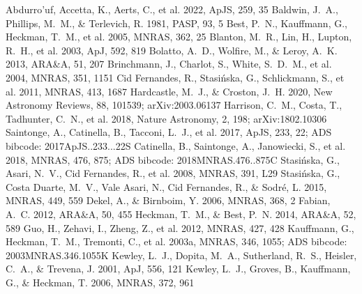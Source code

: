 \documentclass[twocolumn]{aastex631}
\begin{document}

\begin{thebibliography}{}
 Abdurro'uf, Accetta, K., Aerts, C., et al. 2022, ApJS, 259, 35
 Baldwin, J.~A., Phillips, M.~M., \& Terlevich, R. 1981, PASP, 93, 5
 Best, P.~N., Kauffmann, G., Heckman, T.~M., et al. 2005, MNRAS, 362, 25
 Blanton, M.~R., Lin, H., Lupton, R.~H., et al. 2003, ApJ, 592, 819
 Bolatto, A.~D., Wolfire, M., \& Leroy, A.~K. 2013, ARA\&A, 51, 207
 Brinchmann, J., Charlot, S., White, S.~D.~M., et al. 2004, MNRAS, 351, 1151
 Cid Fernandes, R., Stasi{\'n}ska, G., Schlickmann, S., et al. 2011, MNRAS, 413, 1687
 Hardcastle, M.~J., \& Croston, J.~H. 2020, New Astronomy Reviews, 88, 101539; arXiv:2003.06137
 Harrison, C.~M., Costa, T., Tadhunter, C.~N., et al. 2018, Nature Astronomy, 2, 198; arXiv:1802.10306
 Saintonge, A., Catinella, B., Tacconi, L.~J., et al. 2017, ApJS, 233, 22; ADS bibcode: 2017ApJS..233...22S
 Catinella, B., Saintonge, A., Janowiecki, S., et al. 2018, MNRAS, 476, 875; ADS bibcode: 2018MNRAS.476..875C
 Stasi{\'n}ska, G., Asari, N.~V., Cid Fernandes, R., et al. 2008, MNRAS, 391, L29
 Stasi{\'n}ska, G., Costa Duarte, M.~V., Vale Asari, N., Cid Fernandes, R., \& Sodr{\'e}, L. 2015, MNRAS, 449, 559
 Dekel, A., \& Birnboim, Y. 2006, MNRAS, 368, 2
 Fabian, A.~C. 2012, ARA\&A, 50, 455
 Heckman, T.~M., \& Best, P.~N. 2014, ARA\&A, 52, 589
 Guo, H., Zehavi, I., Zheng, Z., et al. 2012, MNRAS, 427, 428
 Kauffmann, G., Heckman, T.~M., Tremonti, C., et al. 2003a, MNRAS, 346, 1055; ADS bibcode: 2003MNRAS.346.1055K
 Kewley, L.~J., Dopita, M.~A., Sutherland, R.~S., Heisler, C.~A., \& Trevena, J. 2001, ApJ, 556, 121
 Kewley, L.~J., Groves, B., Kauffmann, G., \& Heckman, T. 2006, MNRAS, 372, 961

\end{thebibliography}
\end{document}
